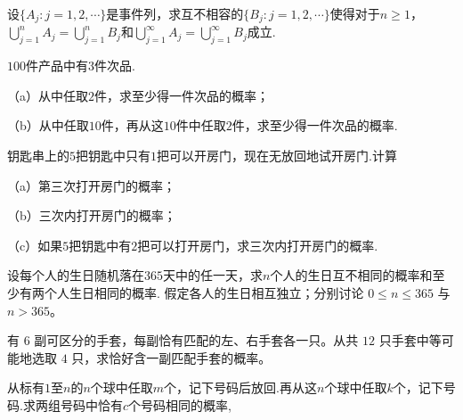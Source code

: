 \begin{exercise}[将事件列化为互斥事件列]\label{q:Y1.4}
设$\{A_j:j=1,2,\cdots\}$是事件列，求互不相容的$\{B_j:j=1,2,\cdots\}$使得对于$n\geqslant 1$，$\bigcup\limits_{j = 1}^n {{A_j}}  = \bigcup\limits_{j = 1}^n {{B_j}} $和$\bigcup\limits_{j = 1}^\infty  {{A_j}}  = \bigcup\limits_{j = 1}^\infty  {{B_j}} $成立.\par{}\end{exercise}

\begin{exercise}[两阶段抽样的对称性]\label{q:Y1.5}
$100$件产品中有$3$件次品.

（a）从中任取$2$件，求至少得一件次品的概率；

（b）从中任取$10$件，再从这$10$件中任取$2$件，求至少得一件次品的概率.\par{}\end{exercise}

\begin{exercise}[无放回试钥匙]\label{q:Y1.7}
钥匙串上的$5$把钥匙中只有$1$把可以开房门，现在无放回地试开房门.计算

（a）第三次打开房门的概率；

（b）三次内打开房门的概率；

（c）如果$5$把钥匙中有$2$把可以打开房门，求三次内打开房门的概率.\par{}\end{exercise}

\begin{exercise}[生日相同的概率]\label{q:Y1.8}
设每个人的生日随机落在$365$天中的任一天，求$n$个人的生日互不相同的概率和至少有两个人生日相同的概率. 假定各人的生日相互独立；分别讨论 $0\le n\le365$ 与 $n>365$。\par{}\end{exercise}

\begin{exercise}[恰好得到一副手套]\label{q:Y1.9}
有 $6$ 副可区分的手套，每副恰有匹配的左、右手套各一只。从共 $12$ 只手套中等可能地选取 $4$ 只，求恰好含一副匹配手套的概率。\par{}\end{exercise}

\begin{exercise}[两次抽样的交集]\label{q:Y1.10}
从标有$1$至$n$的$n$个球中任取$m$个，记下号码后放回.再从这$n$个球中任取$k$个，记下号码.求两组号码中恰有$c$个号码相同的概率,\par{}\end{exercise}

